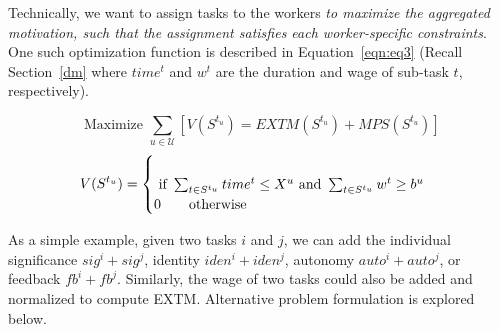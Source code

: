 Technically, we want to assign tasks to the workers {\em to maximize the aggregated motivation, such that the assignment satisfies each worker-specific constraints}. One such optimization function is described in Equation~\ref{eqn:eq3} (Recall Section~\ref{dm} where $time^t$ and $w^t$ are the duration and wage of sub-task $t$, respectively).

\begin{equation}\label{eqn:eq3}
 \text{ Maximize }  \sum_{u \in \mathcal{U}} [V(S^{t_u}) =  EXTM(S^{t_u}) + MPS(S^{t_u})]
\end{equation}
\vspace{-0.2in}
\begin{align*}
 V(S^{t_u}) =
\begin{cases} 
 \\ \text{ if } \sum_{t \in S^{t_u}} time^t \leq X^u \text{ and } \sum_{t \in S^{t_u}} w^t \geq b^u \\
0 \text{\qquad otherwise} 
\end{cases}
\vspace{-0.1in}
\end{align*} 



As a simple example, given two tasks $i$ and $j$, we can add the individual significance $sig^i+sig^j$, identity $iden^i+iden^j$, autonomy $auto^i+auto^j$, or feedback $fb^i+fb^j$. Similarly, the  wage of two tasks could also be added and normalized to compute EXTM. 
Alternative problem formulation is explored below.




